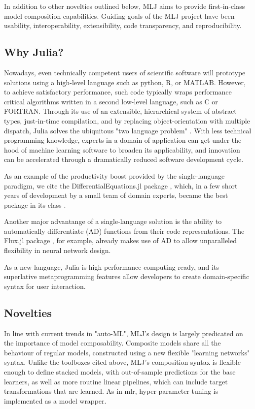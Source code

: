 \documentclass{article}
\begin{document}
In addition to other novelties outlined below, MLJ aims to provide first-in-class model composition capabilities. Guiding goals of the MLJ project have been usability, interoperability, extensibility, code transparency, and reproducibility.

\subsection{Why Julia?}

Nowadays, even technically competent users of scientific software will
prototype solutions using a high-level language such as python, R, or
MATLAB. However, to achieve satisfactory performance, such code
typically wraps performance critical algorithms written in a second
low-level language, such as C or FORTRAN. Through its use of an
extensible, hierarchical system of abstract types, just-in-time
compilation, and by replacing object-orientation with multiple
dispatch, Julia solves the ubiquitous "two language problem"
\cite{BezansonEtal2017}. With less technical programming knowledge,
experts in a domain of application can get under the hood of machine
learning software to broaden its applicability, and innovation can be
accelerated through a dramatically reduced software development cycle.

As an example of the productivity boost provided by the
single-language paradigm, we cite the DifferentialEquations.jl package
\cite{RackauckasNie2017}, which, in a few short years of development
by a small team of domain experts, became the best package in its
class \cite{Rackauckas2017}.

Another major advantange of a single-language solution is the ability
to automatically differentiate (AD) functions from their code
representations. The Flux.jl package \cite{Innes2018}, for example,
already makes use of AD to allow unparalleled flexibility in neural
network design.

As a new language, Julia is high-performance computing-ready, and its
superlative metaprogramming features allow developers to create
domain-specific syntax for user interaction.

\subsection{Novelties}

In line with current trends in "auto-ML", MLJ's design is largely
predicated on the importance of model composability. Composite models
share all the behaviour of regular models, constructed using a new
flexible "learning networks" syntax. Unlike the toolboxes cited above,
MLJ's composition syntax is flexible enough to define stacked models,
with out-of-sample predictions for the base learners, as well as more
routine linear pipelines, which can include target transformations
that are learned. As in mlr, hyper-parameter tuning is implemented as
a model wrapper.
\end{document}
